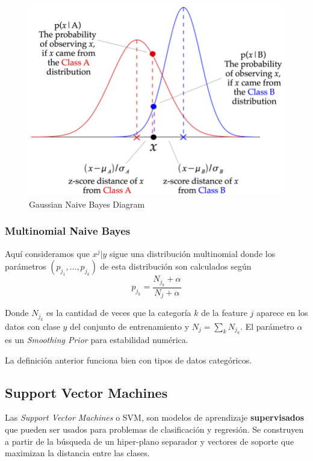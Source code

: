 \begin{figure}[H]
    \center
    \includegraphics[scale=2]{notebooks/ML/img/gaussian_naive_bayes_diagram.png}
    \caption{Gaussian Naive Bayes Diagram}
\end{figure}

\subsubsection{Multinomial Naive Bayes}

Aquí consideramos que $x^j | y$ sigue una distribución multinomial donde los parámetros $(p_{j_1}, \dots , p_{j_k})$ de esta distribución son calculados según 
$$
p_{j_k} = \frac{N_{j_k} + \alpha}{N_j + \alpha}  
$$

Donde $N_{j_k}$ es la cantidad de veces que la categoría $k$ de la feature $j$ aparece en los datos con clase $y$ del conjunto de entrenamiento y $N_j = \sum_k N_{j_k}$. El parámetro $\alpha$ es un \textit{Smoothing Prior} para estabilidad numérica. 

La definición anterior funciona bien con tipos de datos categóricos. 

\subsection{Support Vector Machines}

Las \textit{Support Vector Machines} o SVM, son modelos de aprendizaje \textbf{supervisados} que pueden ser usados para problemas de clasificación y regresión. Se construyen a partir de la búsqueda de un hiper-plano separador y vectores de soporte que maximizan la distancia entre las clases. 


